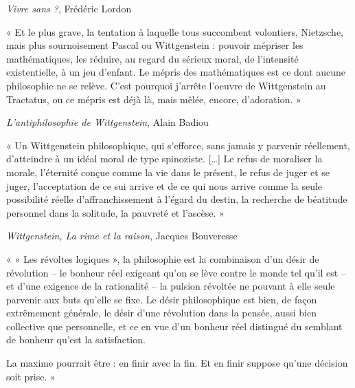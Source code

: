 \documentclass{article}
\begin{document}
\begin{flushright}\textit{Vivre sans ?}, Frédéric Lordon\end{flushright}
\vspace{6pt}
\begin{center} « Et le plus grave, la tentation à laquelle tous succombent volontiers, Nietzsche, mais plus sournoisement Pascal ou Wittgenstein : pouvoir mépriser les mathématiques, les réduire, au regard du sérieux moral, de l’intensité existentielle, à un jeu d’enfant. Le mépris des mathématiques est ce dont aucune philosophie ne se relève. C’est pourquoi j’arrête l’oeuvre de Wittgenstein au Tractatus, ou ce mépris est déjà là, mais mêlée, encore, d’adoration. » \end{center} 
\begin{flushright}\textit{L'antiphilosophie de Wittgenstein}, Alain Badiou\end{flushright}
\vspace{7pt}
\begin{center} « Un Wittgenstein philosophique, qui s’efforce, sans jamais y parvenir réellement, d’atteindre à un idéal moral de type spinoziste. […] Le refus de moraliser la morale, l’éternité conçue comme la vie dans le présent, le refus de juger et se juger, l’acceptation de ce sui arrive et de ce qui nous arrive comme la seule possibilité réelle d’affranchissement à l’égard du destin, la recherche de béatitude personnel dans la solitude, la pauvreté et l’ascèse. » \end{center} 

\begin{flushright}\textit{Wittgenstein, La rime et la raison}, Jacques Bouveresse\end{flushright}
\vspace{7pt}
\begin{center} « « Les révoltes logiques », la philosophie est la combinaison d’un désir de révolution – le bonheur réel exigeant qu’on se lève contre le monde tel qu’il est – et d’une exigence de la rationalité – la pulsion révoltée ne pouvant à elle seule parvenir aux buts qu’elle se fixe.
Le désir philosophique est bien, de façon extrêmement générale, le désir d’une révolution dans la pensée, aussi bien collective que personnelle, et ce en vue d’un bonheur réel distingué du semblant de bonheur qu’est la satisfaction.

La maxime pourrait être : en finir avec la fin. Et en finir suppose qu’une décision soit prise. » \end{center} 
\end{document}
